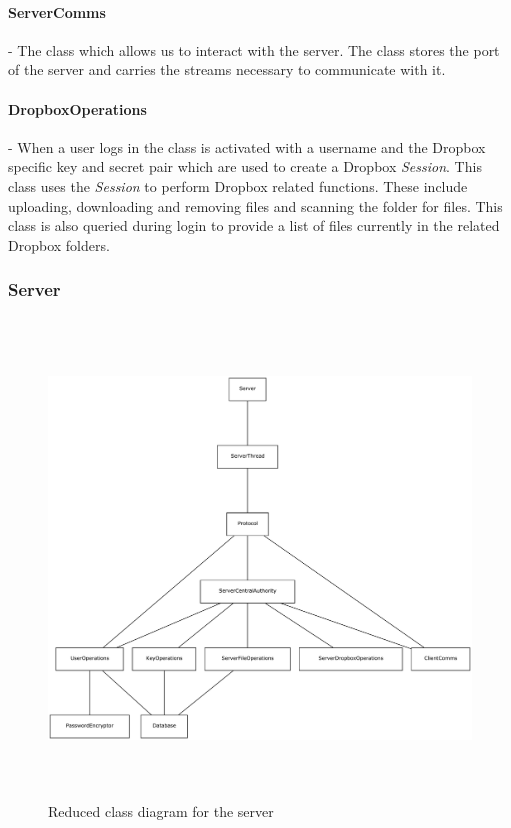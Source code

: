 \documentclass[12pt, titlepage]{article}
\begin{document}
\paragraph*{ServerComms} - The class which allows us to interact with the server. The class stores the port of the server and carries the streams necessary to communicate with it.

\paragraph*{DropboxOperations} - When a user logs in the class is activated with a username and the Dropbox specific key and secret pair which are used to create a Dropbox \textit{Session}. This class uses the \textit{Session} to perform Dropbox related functions. These include uploading, downloading and removing files and  scanning the folder for files. This class is also queried during login to provide a list of files currently in the related Dropbox folders.

\subsubsection{Server}

\begin{figure}
\centerline{\includegraphics[height=5.0in,width=8in,angle=0]{server-classDiagram.pdf}}
\caption{Reduced class diagram for the server}
\label{fig:reducedServerClass}
\end{figure}
\end{document}
